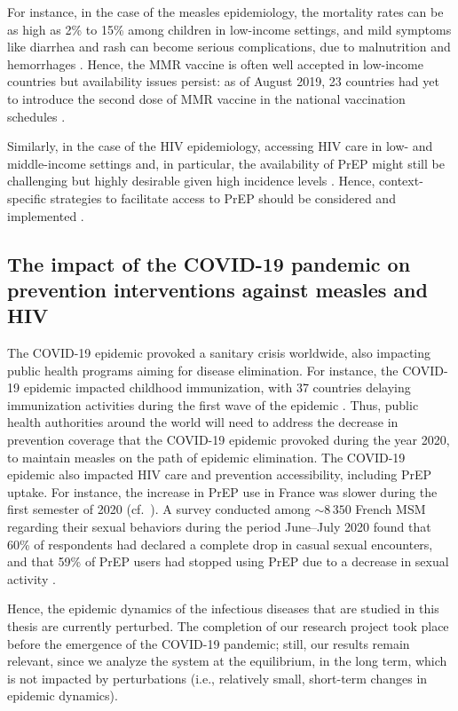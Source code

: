 For instance, in the case of the measles epidemiology, the mortality rates can be as high as 2\% to 15\% among children in low-income settings, and mild symptoms like diarrhea and rash can become serious complications, due to malnutrition and hemorrhages \cite[]{Sever2011}. Hence, the MMR vaccine is often well accepted in low-income countries \cite[]{Larson2016} but availability issues persist: as of August 2019, 23 countries had yet to introduce the second dose of MMR vaccine in the national vaccination schedules \cite[]{WHO_MeaslesWW2019}. 

Similarly, in the case of the HIV epidemiology, accessing HIV care in low- and middle-income settings and, in particular, the availability of PrEP might still be challenging but highly desirable given high incidence levels \cite[]{UNAIDS_Data2019}. Hence, context-specific strategies to facilitate access to PrEP should be considered and implemented \cite[]{Rebe2019}. 

\subsection{The impact of the COVID-19 pandemic on prevention interventions against measles and HIV}
The COVID-19 epidemic provoked a sanitary crisis worldwide, also impacting public health programs aiming for disease elimination. For instance, the COVID-19 epidemic impacted childhood immunization, with 37 countries delaying immunization activities during the first wave of the epidemic \cite[]{WHO_CovidMeasles}. Thus, public health authorities around the world will need to address the decrease in prevention coverage that the COVID-19 epidemic provoked during the year 2020, to maintain measles on the path of epidemic elimination. The COVID-19 epidemic also impacted HIV care and prevention accessibility, including PrEP uptake. For instance, the increase in PrEP use in France was slower during the first semester of 2020 (cf.~). A survey conducted among $\sim8\,350$ French MSM regarding their sexual behaviors during the period June--July 2020 found that 60\% of respondents had declared a complete drop in casual sexual encounters, and that 59\% of PrEP users had stopped using PrEP due to a decrease in sexual activity \cite[]{Velter2020}. 

Hence, the epidemic dynamics of the infectious diseases that are studied in this thesis are currently perturbed. The completion of our research project took place before the emergence of the COVID-19 pandemic; still, our results remain relevant, since we analyze the system at the equilibrium, in the long term, which is not impacted by perturbations (i.e., relatively small, short-term changes in epidemic dynamics). 

